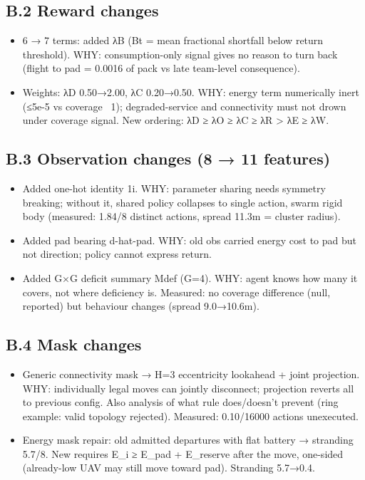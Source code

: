 \documentclass[10pt]{article}
\begin{document}
\subsection{B.2 Reward changes}
\begin{itemize}
\item 6 → 7 terms: added λB (Bt = mean fractional shortfall below return threshold). WHY: consumption-only signal gives no reason to turn back (flight to pad = 0.0016 of pack vs late team-level consequence).
\item Weights: λD 0.50→2.00, λC 0.20→0.50. WHY: energy term numerically inert (≤5e-5 vs coverage ~1); degraded-service and connectivity must not drown under coverage signal. New ordering: λD ≥ λO ≥ λC ≥ λR > λE ≥ λW.
\end{itemize}

\subsection{B.3 Observation changes (8 → 11 features)}
\begin{itemize}
\item Added one-hot identity 1i. WHY: parameter sharing needs symmetry breaking; without it, shared policy collapses to single action, swarm rigid body (measured: 1.84/8 distinct actions, spread 11.3m = cluster radius).
\item Added pad bearing d-hat-pad. WHY: old obs carried energy cost to pad but not direction; policy cannot express return.
\item Added G×G deficit summary Mdef (G=4). WHY: agent knows how many it covers, not where deficiency is. Measured: no coverage difference (null, reported) but behaviour changes (spread 9.0→10.6m).
\end{itemize}

\subsection{B.4 Mask changes}
\begin{itemize}
\item Generic connectivity mask → H=3 eccentricity lookahead + joint projection. WHY: individually legal moves can jointly disconnect; projection reverts all to previous config. Also analysis of what rule does/doesn't prevent (ring example: valid topology rejected). Measured: 0.10/16000 actions unexecuted.
\item Energy mask repair: old admitted departures with flat battery → stranding 5.7/8. New requires E\_i ≥ E\_pad + E\_reserve after the move, one-sided (already-low UAV may still move toward pad). Stranding 5.7→0.4.
\end{itemize}
\end{document}
